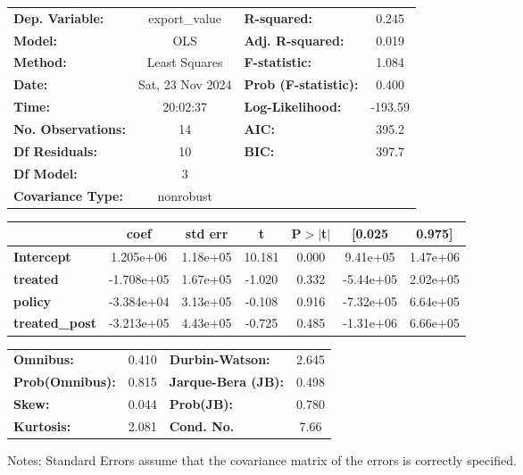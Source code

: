 \begin{center}
\begin{tabular}{lclc}
\toprule
\textbf{Dep. Variable:}    &  export\_value   & \textbf{  R-squared:         } &     0.245   \\
\textbf{Model:}            &       OLS        & \textbf{  Adj. R-squared:    } &     0.019   \\
\textbf{Method:}           &  Least Squares   & \textbf{  F-statistic:       } &     1.084   \\
\textbf{Date:}             & Sat, 23 Nov 2024 & \textbf{  Prob (F-statistic):} &    0.400    \\
\textbf{Time:}             &     20:02:37     & \textbf{  Log-Likelihood:    } &   -193.59   \\
\textbf{No. Observations:} &          14      & \textbf{  AIC:               } &     395.2   \\
\textbf{Df Residuals:}     &          10      & \textbf{  BIC:               } &     397.7   \\
\textbf{Df Model:}         &           3      & \textbf{                     } &             \\
\textbf{Covariance Type:}  &    nonrobust     & \textbf{                     } &             \\
\bottomrule
\end{tabular}
\begin{tabular}{lcccccc}
                       & \textbf{coef} & \textbf{std err} & \textbf{t} & \textbf{P$> |$t$|$} & \textbf{[0.025} & \textbf{0.975]}  \\
\midrule
\textbf{Intercept}     &    1.205e+06  &     1.18e+05     &    10.181  &         0.000        &     9.41e+05    &     1.47e+06     \\
\textbf{treated}       &   -1.708e+05  &     1.67e+05     &    -1.020  &         0.332        &    -5.44e+05    &     2.02e+05     \\
\textbf{policy}        &   -3.384e+04  &     3.13e+05     &    -0.108  &         0.916        &    -7.32e+05    &     6.64e+05     \\
\textbf{treated\_post} &   -3.213e+05  &     4.43e+05     &    -0.725  &         0.485        &    -1.31e+06    &     6.66e+05     \\
\bottomrule
\end{tabular}
\begin{tabular}{lclc}
\textbf{Omnibus:}       &  0.410 & \textbf{  Durbin-Watson:     } &    2.645  \\
\textbf{Prob(Omnibus):} &  0.815 & \textbf{  Jarque-Bera (JB):  } &    0.498  \\
\textbf{Skew:}          &  0.044 & \textbf{  Prob(JB):          } &    0.780  \\
\textbf{Kurtosis:}      &  2.081 & \textbf{  Cond. No.          } &     7.66  \\
\bottomrule
\end{tabular}
\end{center}

Notes: \newline
 [1] Standard Errors assume that the covariance matrix of the errors is correctly specified.